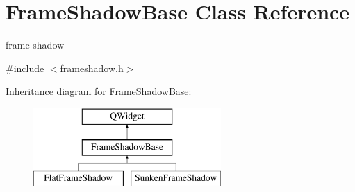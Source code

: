 \hypertarget{class_frame_shadow_base}{}\section{Frame\+Shadow\+Base Class Reference}
\label{class_frame_shadow_base}


frame shadow  




{\ttfamily \#include $<$frameshadow.\+h$>$}

Inheritance diagram for Frame\+Shadow\+Base\+:\begin{figure}[H]
\begin{center}
\leavevmode
\includegraphics[height=3.000000cm]{class_frame_shadow_base}
\end{center}
\end{figure}
